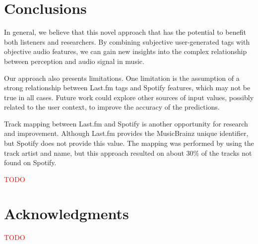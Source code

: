 \documentclass[sn-mathphys]{sn-jnl}%
\theoremstyle{thmstyleone}%
\theoremstyle{thmstyletwo}%
\theoremstyle{thmstylethree}%
\begin{document}
\section{Conclusions}

In general, we believe that this novel approach that has the potential to benefit both listeners and researchers.
By combining subjective user-generated tags with objective audio features,
we can gain new insights into the complex relationship between perception and audio signal in music.

Our approach also presents limitations.
One limitation is the assumption of a strong relationship between Last.fm tags and Spotify features, which may not be true in all cases.
Future work could explore other sources of input values, possibly related to the user context, to improve the accuracy of the predictions.

Track mapping between Last.fm and Spotify is another opportunity for research and improvement.
Although Last.fm provides the MusicBrainz unique identifier, but Spotify does not provide this value.
The mapping was performed by using the track artist and name, but this approach resulted on about 30\% of the tracks not found on Spotify.



\textcolor{red}{TODO}


\section{Acknowledgments}

\textcolor{red}{TODO}





\end{document}
